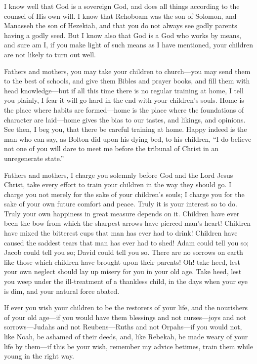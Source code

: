 \documentclass[
]{book}
\begin{document}
I know well that God is a sovereign God, and does all things according to the counsel of His own will. I know that Rehoboam was the son of Solomon, and Manasseh the son of Hezekiah, and that you do not always see godly parents having a godly seed. But I know also that God is a God who works by means, and sure am I, if you make light of such means as I have mentioned, your children are not likely to turn out well.

Fathers and mothers, you may take your children to church---you may send them to the best of schools, and give them Bibles and prayer books, and fill them with head knowledge---but if all this time there is no regular training at home, I tell you plainly, I fear it will go hard in the end with your children's souls. Home is the place where habits are formed---home is the place where the foundations of character are laid---home gives the bias to our tastes, and likings, and opinions. See then, I beg you, that there be careful training at home. Happy indeed is the man who can say, as Bolton did upon his dying bed, to his children, ``I do believe not one of you will dare to meet me before the tribunal of Christ in an unregenerate state.''

Fathers and mothers, I charge you solemnly before God and the Lord Jesus Christ, take every effort to train your children in the way they should go. I charge you not merely for the sake of your children's souls; I charge you for the sake of your own future comfort and peace. Truly it is your interest so to do. Truly your own happiness in great measure depends on it. Children have ever been the bow from which the sharpest arrows have pierced man's heart! Children have mixed the bitterest cups that man has ever had to drink! Children have caused the saddest tears that man has ever had to shed! Adam could tell you so; Jacob could tell you so; David could tell you so. There are no sorrows on earth like those which children have brought upon their parents! Oh! take heed, lest your own neglect should lay up misery for you in your old age. Take heed, lest you weep under the ill-treatment of a thankless child, in the days when your eye is dim, and your natural force abated.

If ever you wish your children to be the restorers of your life, and the nourishers of your old age---if you would have them blessings and not curses---joys and not sorrows---Judahs and not Reubens---Ruths and not Orpahs---if you would not, like Noah, be ashamed of their deeds, and, like Rebekah, be made weary of your life by them---if this be your wish, remember my advice betimes, train them while young in the right way.
\end{document}
